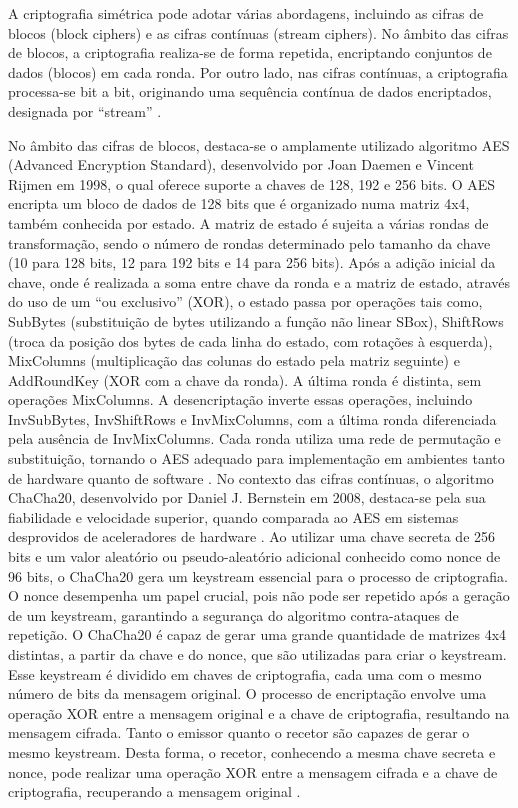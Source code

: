 \documentclass{report}
\begin{document}
A criptografia simétrica pode adotar várias abordagens, incluindo as cifras de blocos (block ciphers) e as cifras contínuas (stream ciphers). No âmbito das cifras de blocos, a criptografia realiza-se de forma repetida, encriptando conjuntos de dados (blocos) em cada ronda. Por outro lado, nas cifras contínuas, a criptografia processa-se bit a bit, originando uma sequência contínua de dados encriptados, designada por “stream” \cite{Conrad.17}.

No âmbito das cifras de blocos, destaca-se o amplamente utilizado algoritmo AES (Advanced Encryption Standard), desenvolvido por Joan Daemen e Vincent Rijmen em 1998, o qual oferece suporte a chaves de 128, 192 e 256 bits. O AES encripta um bloco de dados de 128 bits que é organizado numa matriz 4x4, também conhecida por estado. A matriz de estado é sujeita a várias rondas de transformação, sendo o número de rondas determinado pelo tamanho da chave (10 para 128 bits, 12 para 192 bits e 14 para 256 bits). Após a adição inicial da chave, onde é realizada a soma entre chave da ronda e a matriz de estado, através do uso de um “ou exclusivo” (XOR), o estado passa por operações tais como, SubBytes (substituição de bytes utilizando a função não linear SBox), ShiftRows (troca da posição dos bytes de cada linha do estado, com rotações à esquerda), MixColumns (multiplicação das colunas do estado pela matriz seguinte) e AddRoundKey (XOR com a chave da ronda). A última ronda é distinta, sem operações MixColumns. A desencriptação inverte essas operações, incluindo InvSubBytes, InvShiftRows e InvMixColumns, com a última ronda diferenciada pela ausência de InvMixColumns. Cada ronda utiliza uma rede de permutação e substituição, tornando o AES adequado para implementação em ambientes tanto de hardware quanto de software \cite{Patil.16, Resende.14, Azevedo.13}. No contexto das cifras contínuas, o algoritmo ChaCha20, desenvolvido por Daniel J. Bernstein em 2008, destaca-se pela sua fiabilidade e velocidade superior, quando comparada ao AES em sistemas desprovidos de aceleradores de hardware \cite{Bernstein.08, Semenov.20}. Ao utilizar uma chave secreta de 256 bits e um valor aleatório ou pseudo-aleatório adicional conhecido como nonce de 96 bits, o ChaCha20 gera um keystream essencial para o processo de criptografia. O nonce desempenha um papel crucial, pois não pode ser repetido após a geração de um keystream, garantindo a segurança do algoritmo contra-ataques de repetição. O ChaCha20 é capaz de gerar uma grande quantidade de matrizes 4x4 distintas, a partir da chave e do nonce, que são utilizadas para criar o keystream. Esse keystream é dividido em chaves de criptografia, cada uma com o mesmo número de bits da mensagem original. O processo de encriptação envolve uma operação XOR entre a mensagem original e a chave de criptografia, resultando na mensagem cifrada. Tanto o emissor quanto o recetor são capazes de gerar o mesmo keystream. Desta forma, o recetor, conhecendo a mesma chave secreta e nonce, pode realizar uma operação XOR entre a mensagem cifrada e a chave de criptografia, recuperando a mensagem original \cite{Semenov.20, Lima}.
\end{document}
